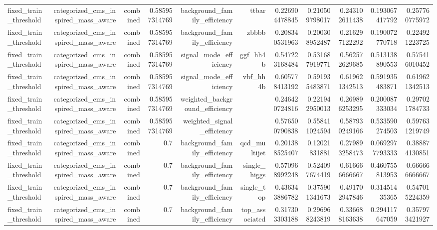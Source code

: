 \begin{table}[htbp]
{\begin{tabular}{lrrrrrrrrrr}
fixed\_train\_threshold & categorized\_cms\_inspired\_mass\_aware & combined & 0.585957314769 & background\_family\_efficiency & ttbar & 0.226904478845 & 0.210509798017 & 0.243102611438 & 0.193067417792 & 0.257760775972 \\
fixed\_train\_threshold & categorized\_cms\_inspired\_mass\_aware & combined & 0.585957314769 & background\_family\_efficiency & zbbbb & 0.208340531963 & 0.200308952487 & 0.216297122292 & 0.190072770718 & 0.224921223725 \\
fixed\_train\_threshold & categorized\_cms\_inspired\_mass\_aware & combined & 0.585957314769 & signal\_mode\_efficiency & ggf\_hh4b & 0.547223168484 & 0.531687919771 & 0.562572629685 & 0.513138890553 & 0.575416010452 \\
fixed\_train\_threshold & categorized\_cms\_inspired\_mass\_aware & combined & 0.585957314769 & signal\_mode\_efficiency & vbf\_hh4b & 0.605778413192 & 0.591935483871 & 0.619621342513 & 0.591935483871 & 0.619621342513 \\
fixed\_train\_threshold & categorized\_cms\_inspired\_mass\_aware & combined & 0.585957314769 & weighted\_background\_efficiency &  & 0.246420724816 & 0.221942950013 & 0.269896253295 & 0.200087333034 & 0.297021784733 \\
fixed\_train\_threshold & categorized\_cms\_inspired\_mass\_aware & combined & 0.585957314769 & weighted\_signal\_efficiency &  & 0.576500790838 & 0.558411024594 & 0.587930249166 & 0.533590274503 & 0.597631219749 \\
fixed\_train\_threshold & categorized\_cms\_inspired\_mass\_aware & combined & 0.7 & background\_family\_efficiency & qcd\_multijet & 0.201388525407 & 0.12021831881 & 0.279893258473 & 0.0692977793333 & 0.388874130851 \\
fixed\_train\_threshold & categorized\_cms\_inspired\_mass\_aware & combined & 0.7 & background\_family\_efficiency & single\_higgs & 0.570968992248 & 0.524097674419 & 0.616666666667 & 0.460755813953 & 0.666666666667 \\
fixed\_train\_threshold & categorized\_cms\_inspired\_mass\_aware & combined & 0.7 & background\_family\_efficiency & single\_top & 0.436343886782 & 0.375901341673 & 0.491702947846 & 0.31451435365 & 0.547015224359 \\
fixed\_train\_threshold & categorized\_cms\_inspired\_mass\_aware & combined & 0.7 & background\_family\_efficiency & top\_associated & 0.317303303188 & 0.296968243819 & 0.336688163638 & 0.294117647059 & 0.357973421927 \\

\end{tabular}}
\end{table}
